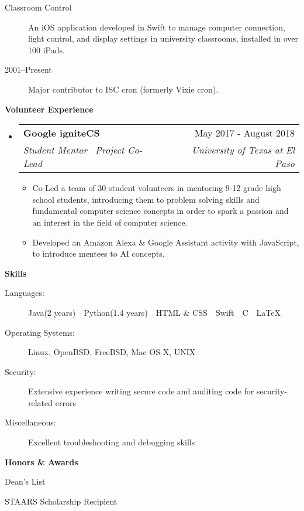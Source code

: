 \documentclass[letterpaper,10pt]{article}
\makeatletter
\newcommand{\resitem}[1]{\item #1 \vspace{-2pt}}
\newcommand{\resheading}[1]{{\large \colorbox{mygrey}{\begin{minipage}{\textwidth}{\textbf{#1 \vphantom{p\^{E}}}}\end{minipage}}}}
\newcommand{\ressubheading}[4]{
\begin{tabular*}{7.0in}{l@{\extracolsep{\fill}}r}
		\textbf{#1} & #2 \\
		\textit{#3} & \textit{#4} \\
\end{tabular*}\vspace{-6pt}}
\makeatother
\begin{document}
\begin{description}
\item[Classroom Control] An iOS application developed in Swift to manage computer connection, light control, and display settings in university classrooms, installed in over 100 iPads.
\item[2001--Present] Major contributor to ISC cron (formerly Vixie cron).

\end{description}
\resheading{Volunteer Experience}
\begin{itemize}
	\item
	\ressubheading{Google igniteCS}{May 2017 - August 2018}{Student Mentor \textbar\  Project Co-Lead}{University of Texas at El Paso}
	\begin{itemize}
		\resitem{Co-Led a team of 30 student volunteers in mentoring 9-12 grade high school students, introducing them to problem solving skills and fundamental computer science concepts in order to spark a passion and an interest in the field of computer science.}
		\resitem{Developed an Amazon Alexa \& Google Assistant activity with JavaScript, to introduce mentees to AI concepts.}
	\end{itemize}
\end{itemize}


\resheading{Skills}

\begin{description}
\item[Languages:]
Java(2 years)\ \textbar\ Python(1.4 years)\ \textbar\ HTML \& CSS\ \textbar\ Swift\ \textbar\ C\ \textbar\ LaTeX
\item[Operating Systems:]
Linux, OpenBSD, FreeBSD, Mac OS X, {\sc UNIX}
\item[Security:]
Extensive experience writing secure code and auditing code for security-related errors
\item[Miscellaneous:]
Excellent troubleshooting and debugging skills
\end{description}

\resheading{Honors \& Awards}
\begin{description}
	\item Dean's List 
	\item STAARS Scholarship Recipient 
\end{description}
\end{document}
